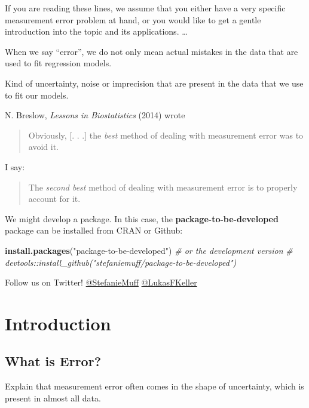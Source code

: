 \documentclass[]{book}
\newenvironment{Shaded}{\begin{snugshade}}{\end{snugshade}}
\newcommand{\KeywordTok}[1]{\textcolor[rgb]{0.13,0.29,0.53}{\textbf{#1}}}
\newcommand{\StringTok}[1]{\textcolor[rgb]{0.31,0.60,0.02}{#1}}
\newcommand{\CommentTok}[1]{\textcolor[rgb]{0.56,0.35,0.01}{\textit{#1}}}
\newcommand{\NormalTok}[1]{#1}
\theoremstyle{definition}
\theoremstyle{definition}
\theoremstyle{definition}
\theoremstyle{remark}
\begin{document}
If you are reading these lines, we assume that you either have a very
specific measurement error problem at hand, or you would like to get a
gentle introduction into the topic and its applications. \ldots{}

When we say ``error'', we do not only mean actual mistakes in the data
that are used to fit regression models.

Kind of uncertainty, noise or imprecision that are present in the data
that we use to fit our models.

N. Breslow, \emph{Lessons in Biostatistics} (2014) \citep{breslow2014}
wrote

\begin{quote}
Obviously, {[}. . .{]} the \emph{best} method of dealing with
measurement error was to avoid it.
\end{quote}

I say:

\begin{quote}
The \emph{second best} method of dealing with measurement error is to
properly account for it.
\end{quote}

We might develop a package. In this case, the
\textbf{package-to-be-developed} package can be installed from CRAN or
Github:

\begin{Shaded}
\begin{Highlighting}[]
\KeywordTok{install.packages}\NormalTok{(}\StringTok{"package-to-be-developed"}\NormalTok{)}
\CommentTok{# or the development version}
\CommentTok{# devtools::install_github("stefaniemuff/package-to-be-developed")}
\end{Highlighting}
\end{Shaded}

Follow us on Twitter!
\href{https://twitter.com/stefaniemuff}{@StefanieMuff}
\href{https://twitter.com/lukasfkeller}{@LukasFKeller}

\chapter{Introduction}\label{intro}

\section{What is Error?}\label{what-is-error}

Explain that measurement error often comes in the shape of uncertainty,
which is present in almost all data.
\end{document}
